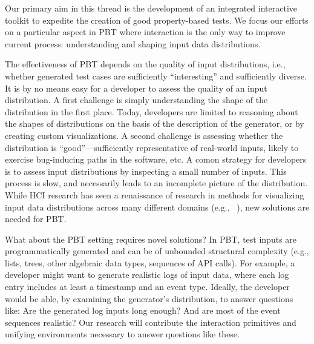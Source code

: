 %
Our primary aim in this thread is the development of an integrated interactive toolkit to expedite the creation of good property-based tests. We focus our efforts on a particular aspect in PBT where interaction is the only way to improve current process: understanding and shaping input data distributions.

The effectiveness of PBT depends on the quality of input distributions, i.e., whether generated test cases are sufficiently ``interesting'' and sufficiently diverse.
It is by no means easy for a developer to assess the quality of
an input distribution. A first challenge is simply understanding the shape of the distribution in the first place. Today, developers are limited to reasoning about the shapes of distributions on the basis of the description of the generator, or by creating custom visualizations. A second challenge is assessing whether the distribution is ``good''---sufficiently representative of real-world inputs, likely to exercise bug-inducing paths in the software, etc.
A comon strategy for developers is to assess input distributions by inspecting a
small number of inputs. This process is slow, and necessarily leads to an incomplete picture of the distribution.
While HCI research has seen a renaissance of research in methods for
visualizing input data distributions across many different domains (e.g.,
~\cite{ref:hohman2019gamut,ref:hohman2020understanding,ref:kang2017omnicode}), new solutions are needed for PBT.

What about the PBT setting requires novel solutions?
In PBT, test inputs are
programmatically generated and
can be of unbounded structural
complexity (e.g., lists, trees, other algebraic data types,
sequences of API calls).
For example, a developer might want to generate
realistic logs of input data, where each log entry includes at least a timestamp
and an event type.
%
Ideally, the developer would be able, by examining the generator's
distribution, to answer
questions like: Are the generated log inputs long enough? And are most
of the event sequences realistic?
Our research will contribute the interaction primitives and
 unifying environments necessary to answer questions like these.

